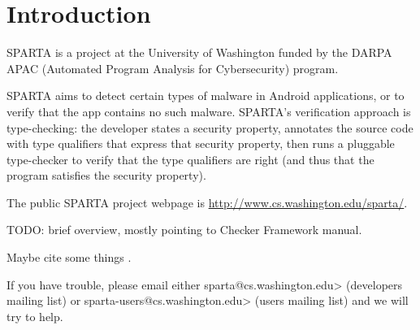 \htmlhr
\chapter{Introduction\label{introduction}}

SPARTA is a project at the University of Washington funded by the DARPA
APAC (Automated Program Analysis for Cybersecurity) program.


SPARTA aims to detect certain types of malware in Android applications, or
to verify that the app contains no such malware.  SPARTA's verification
approach is type-checking:  the developer states a security property,
annotates the source code with type qualifiers that express that security
property, then runs a pluggable type-checker to verify that the type
qualifiers are right (and thus that the program satisfies the security
property).

The public SPARTA project webpage is
\url{http://www.cs.washington.edu/sparta/}.




TODO: brief overview, mostly pointing to Checker Framework manual.

Maybe cite some things
\cite{PapiACPE2008}.



If you have trouble, please email either \<sparta@cs.washington.edu>
(developers mailing list) or \<sparta-users@cs.washington.edu> (users
mailing list) and we will try to help.





